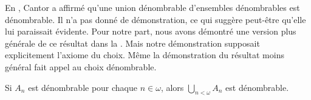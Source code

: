 \documentclass[../../../include/open-logic-section]{subfiles}
\begin{document}
\begin{ex}
En \citeyear{Cantor1878}, Cantor a affirmé
qu'une union dénombrable d'ensembles
dénombrables est dénombrable.
Il n'a pas donné de démonstration,
ce qui suggère peut-être qu'elle
lui paraissait évidente. Pour notre
part, nous avons démontré une version
plus générale de ce résultat dans la
.
Mais notre démonstration supposait
explicitement l'axiome du choix.
Même la démonstration du résultat moins général
fait appel au choix dénombrable.

\begin{thm}
Si $A_n$ est dénombrable pour chaque
$n \in \omega$, alors
$\bigcup_{n < \omega} A_n$
est dénombrable.
\end{thm}


\end{ex}
\end{document}
